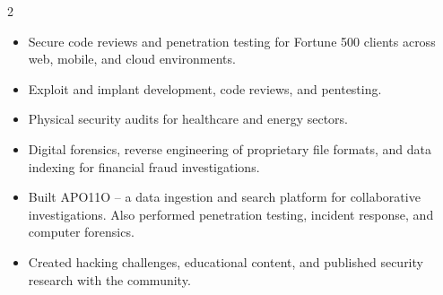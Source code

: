 \documentclass[10pt,a4paper,ragged2e,withhyper]{altacv}
\begin{document}
\begin{paracol}{2}
\newpage

\begin{itemize}
\item Secure code reviews and penetration testing for Fortune 500 clients across web, mobile, and cloud environments.
\end{itemize}

\divider
\vspace{0.5em}

\begin{itemize}
\item Exploit and implant development, code reviews, and pentesting.
\item Physical security audits for healthcare and energy sectors.
\end{itemize}

\divider
\vspace{0.5em}

\begin{itemize}
\item Digital forensics, reverse engineering of proprietary file formats, and data indexing for financial fraud investigations.
\end{itemize}

\divider
\vspace{0.5em}

\begin{itemize}
\item Built APO11O -- a data ingestion and search platform for collaborative investigations. Also performed penetration testing, incident response, and computer forensics.
\end{itemize}

\divider
\vspace{0.5em}

\begin{itemize}
\item Created hacking challenges, educational content, and published security research with the community.
\end{itemize}

\switchcolumn


\end{paracol}
\end{document}
